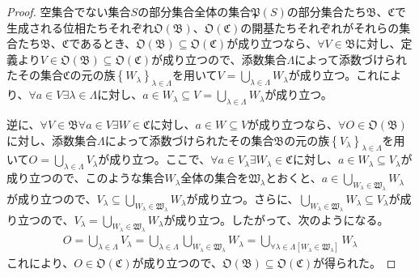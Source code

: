 \documentclass[dvipdfmx]{jsarticle}
\begin{document}
\begin{proof}
空集合でない集合$S$の部分集合全体の集合$\mathfrak{P}(S)$の部分集合たち$\mathfrak{B}$、$\mathfrak{C}$で生成される位相たちそれぞれ$\mathfrak{O}\left( \mathfrak{B} \right)$、$\mathfrak{O}\left( \mathfrak{C} \right)$の開基たちそれぞれがそれらの集合たち$\mathfrak{B}$、$\mathfrak{C}$であるとき、$\mathfrak{O}\left( \mathfrak{B} \right)\subseteq \mathfrak{O}\left( \mathfrak{C} \right)$が成り立つなら、$\forall V \in \mathfrak{B}$に対し、定義より$V \in \mathfrak{O}\left( \mathfrak{B} \right)\subseteq \mathfrak{O}\left( \mathfrak{C} \right)$が成り立つので、添数集合$\varLambda$によって添数づけられたその集合$\mathfrak{C}$の元の族$\left\{ W_{\lambda} \right\}_{\lambda \in \varLambda}$を用いて$V = \bigcup_{\lambda \in \varLambda} W_{\lambda}$が成り立つ。これにより、$\forall a \in V\exists\lambda \in \varLambda$に対し、$a \in W_{\lambda} \subseteq V = \bigcup_{\lambda \in \varLambda} W_{\lambda}$が成り立つ。\par
逆に、$\forall V \in \mathfrak{B\forall}a \in V\exists W\in \mathfrak{C}$に対し、$a \in W \subseteq V$が成り立つなら、$\forall O \in \mathfrak{O}\left( \mathfrak{B} \right)$に対し、添数集合$\varLambda$によって添数づけられたその集合$\mathfrak{B}$の元の族$\left\{ V_{\lambda} \right\}_{\lambda \in \varLambda}$を用いて$O = \bigcup_{\lambda \in \varLambda} V_{\lambda}$が成り立つ。ここで、$\forall a \in V_{\lambda}\exists W_{\lambda}\in \mathfrak{C}$に対し、$a \in W_{\lambda} \subseteq V_{\lambda}$が成り立つので、このような集合$W_{\lambda}$全体の集合を$\mathfrak{W}_{\lambda}$とおくと、$a \in \bigcup_{W_{\lambda} \in \mathfrak{W}_{\lambda}} W_{\lambda}$が成り立つので、$V_{\lambda} \subseteq \bigcup_{W_{\lambda} \in \mathfrak{W}_{\lambda}} W_{\lambda}$が成り立つ。さらに、$\bigcup_{W_{\lambda} \in \mathfrak{W}_{\lambda}} W_{\lambda} \subseteq V_{\lambda}$が成り立つので、$V_{\lambda} = \bigcup_{W_{\lambda} \in \mathfrak{W}_{\lambda}} W_{\lambda}$が成り立つ。したがって、次のようになる。
\begin{align*}
O = \bigcup_{\lambda \in \varLambda} V_{\lambda} = \bigcup_{\lambda \in \varLambda} {\bigcup_{W_{\lambda} \in \mathfrak{W}_{\lambda}} W_{\lambda}} = \bigcup_{\forall\lambda \in \varLambda\left[ W_{\lambda} \in \mathfrak{W}_{\lambda} \right]} W_{\lambda}
\end{align*}
これにより、$O \in \mathfrak{O}\left( \mathfrak{C} \right)$が成り立つので、$\mathfrak{O}\left( \mathfrak{B} \right)\subseteq \mathfrak{O}\left( \mathfrak{C} \right)$が得られた。
\end{proof}
\end{document}
